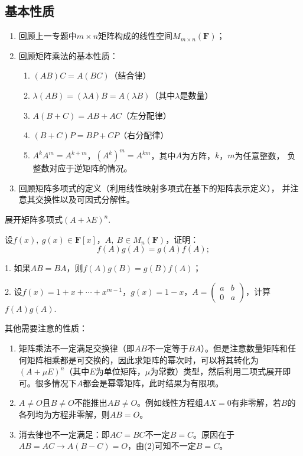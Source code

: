 \subsection{基本性质}
\begin{enumerate}
	\item 回顾上一专题中$m \times n$矩阵构成的线性空间$M_{m \times n}(\mathbf{F})$；
	\item 回顾矩阵乘法的基本性质：
	\begin{enumerate}
		\item $(AB)C=A(BC)$（结合律）
		\item $\lambda(AB)=(\lambda A)B=A(\lambda B)$（其中$\lambda$是数量）
		\item $A(B+C)=AB+AC$（左分配律）
		\item $(B+C)P=BP+CP$（右分配律）
		\item $A^kA^m=A^{k+m}$，$(A^k)^m=A^{km}$，其中$A$为方阵，$k$，$m$为任意整数，
		负整数对应于逆矩阵的情况。
	\end{enumerate}
	\item 回顾矩阵多项式的定义（利用线性映射多项式在基下的矩阵表示定义），
	并注意其交换性以及可因式分解性。
\end{enumerate}
\begin{example}
	展开矩阵多项式$(A+\lambda E)^n$.
\end{example}
\begin{example}
	设$f(x),\ g(x) \in \mathbf{F}[x]$，$A,\ B \in M_n(\mathbf{F})$，证明：
	$$f(A)g(A)=g(A)f(A);$$
	
	\textup{1. }如果$AB=BA$，则$f(A)g(B)=g(B)f(A)$\textup{；}

	\textup{2. }设$f(x)=1+x+\cdots+x^{m-1}$，$g(x)=1-x$，$A=\begin{pmatrix}
		a & b \\ 0 & a
	\end{pmatrix}$，计算$f(A)g(A)$.
\end{example}
其他需要注意的性质：
\begin{enumerate}
	\item 矩阵乘法不一定满足交换律（即$AB$不一定等于$BA$）。但是注意数量矩阵和任何矩阵相乘都是可交换的，因此求矩阵的幂次时，可以将其转化为$(A+\mu E)^n$（其中$E$为单位矩阵，$\mu$为常数）类型，然后利用二项式展开即可。很多情况下$A$都会是幂零矩阵，此时结果为有限项。
	\item $A\neq O$且$B\neq O$不能推出$AB\neq O$。例如线性方程组$AX = 0$有非零解，若$B$的各列均为方程非零解，则$AB = O$。
	\item 消去律也不一定满足：即$AC = BC$不一定$B = C$。原因在于$AB=AC \to A(B-C)=O$，由(2)可知不一定$B = C$。
\end{enumerate}

